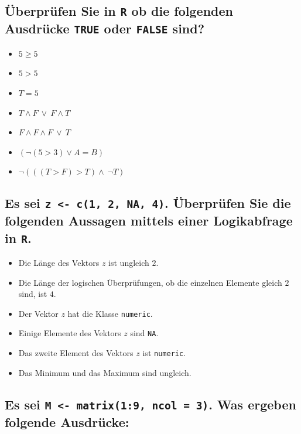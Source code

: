 \documentclass[12pt,a4paper]{article}
\begin{document}
\subsection{\texorpdfstring{Überprüfen Sie in \texttt{R} ob die
folgenden Ausdrücke \texttt{TRUE} oder \texttt{FALSE}
sind?}{Überprüfen Sie in R ob die folgenden Ausdrücke TRUE oder FALSE sind?}}\label{uxfcberpruxfcfen-sie-in-r-ob-die-folgenden-ausdruxfccke-true-oder-false-sind}

\begin{itemize}
  \item $5 \geq 5$
  \item $5 > 5$
  \item $T = 5$
  \item $T \land F \ \lor \ F \land T$
  \item $F \land F \land F\ \lor \ T$
  \item $(\neg (5 > 3) \lor A = B)$
  \item $\neg(((T > F) > T) \land \ \neg T)$
\end{itemize}

\subsection{\texorpdfstring{Es sei
\texttt{z\ \textless{}-\ c(1,\ 2,\ NA,\ 4)}. Überprüfen Sie die
folgenden Aussagen mittels einer Logikabfrage in
\texttt{R}.}{Es sei z \textless- c(1, 2, NA, 4). Überprüfen Sie die folgenden Aussagen mittels einer Logikabfrage in R.}}\label{es-sei-z---c1-2-na-4.-uxfcberpruxfcfen-sie-die-folgenden-aussagen-mittels-einer-logikabfrage-in-r.}

\begin{itemize}
  \item Die Länge des Vektors $z$ ist ungleich $2$.
  \item Die Länge der logischen Überprüfungen, ob die einzelnen Elemente gleich $2$ sind, ist $4$.
  \item Der Vektor $z$ hat die Klasse \texttt{numeric}.
  \item Einige Elemente des Vektors $z$ sind \texttt{NA}. 
  \item Das zweite Element des Vektors $z$ ist \texttt{numeric}.
  \item Das Minimum und das Maximum sind ungleich. 
\end{itemize}

\subsection{\texorpdfstring{Es sei \texttt{M <- matrix(1:9, ncol = 3)}.
Was ergeben folgende
Ausdrücke:}{Es sei . Was ergeben folgende Ausdrücke:}}\label{es-sei-.-was-ergeben-folgende-ausdruxfccke}
\end{document}
